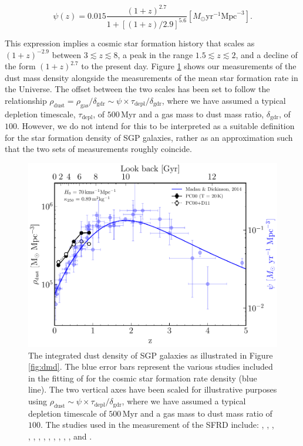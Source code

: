 \begin{equation}
    \psi(z) = 0.015\frac{(1+z)^{2.7}}{1+[(1+z)/2.9]^{5.6}} [M_{\odot}\textrm{yr}^{-1}\textrm{Mpc}^{-3}].
    \label{eq:madau_sfrd}
\end{equation}

This expression implies a cosmic star formation history that scales as $(1+z)^{-2.9}$ between $3 \lesssim z \lesssim 8$, a peak in the range $1.5 \lesssim z \lesssim 2$, and a decline of the form $(1+z)^{2.7}$ to the present day. Figure \ref{fig:sfrd} shows our measurements of the dust mass density alongside the measurements of the mean star formation rate in the Universe. The offset between the two scales has been set to follow the relationship $\rho_{\textrm{dust}} = \rho_{\textrm{gas}}/\delta_{\textrm{gdr}} \sim \psi \times\tau_{\textrm{depl}}/\delta_{\textrm{gdr}}$, where we have assumed a typical depletion timescale, $\tau_{\textrm{depl}}$, of $500\,$Myr and a gas mass to dust mass ratio, $\delta_{\textrm{gdr}}$, of $100$. However, we do not intend for this to be interpreted as a suitable definition for the star formation density of SGP galaxies, rather as an approximation such that the two sets of measurements roughly coincide. 

\begin{figure}
	\centering
	\includegraphics[width=0.8\columnwidth]{Figures/sfrd.pdf}
	\caption[Comparison of dust mass density and the cosmic star formation rate density]{The integrated dust density of SGP galaxies as illustrated in Figure \ref{fig:dmd}. The blue error bars represent the various studies included in the fitting of \citealt{Madau_2014} for the cosmic star formation rate density (blue line). The two vertical axes have been scaled for illustrative purposes using $\rho_{\textrm{dust}} \sim \psi \times\tau_{\textrm{depl}}/\delta_{\textrm{gdr}}$, where we have assumed a typical depletion timescale of $500\,$Myr and a gas mass to dust mass ratio of $100$. The studies used in the measurement of the SFRD include: \citealt{Sanders_2003}, \citealt{Takeuchi_2003}, \citealt{Wyder_2005}, \citealt{Schiminovich_2005}, \citealt{Reddy_2009}, \citealt{Robotham_2011}, \citealt{Magnelli_2011}, \citealt{Cucciati_2012}, \citealt{Bouwens_2012b}, \citealt{Bouwens_2012a}, \citealt{Schenker_2013}, \citealt{Magnelli_2013}, \citealt{Gruppioni_2013} and \citealt{Dahlen_2007}.}
    \label{fig:sfrd}
\end{figure}

